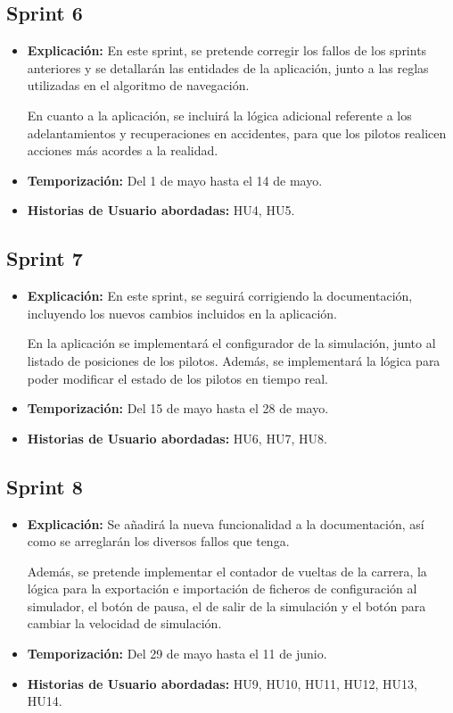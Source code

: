 \subsection{Sprint 6}

\begin{itemize}
    \item \textbf{Explicación:} En este sprint, se pretende corregir los fallos de los sprints anteriores y se detallarán las entidades de la aplicación, junto a las reglas utilizadas en el algoritmo de navegación.
    
    En cuanto a la aplicación, se incluirá la lógica adicional referente a los adelantamientos y recuperaciones en accidentes, para que los pilotos realicen acciones más acordes a la realidad.
    

    \item \textbf{Temporización:} Del 1 de mayo hasta el 14 de mayo.
    \item \textbf{Historias de Usuario abordadas:} HU4, HU5.
\end{itemize}

\subsection{Sprint 7}

\begin{itemize}
    \item \textbf{Explicación:} En este sprint, se seguirá corrigiendo la documentación, incluyendo los nuevos cambios incluidos en la aplicación.
    
    En la aplicación se implementará el configurador de la simulación, junto al listado de posiciones de los pilotos. Además, se implementará la lógica para poder modificar el estado de los pilotos en tiempo real.
    
    \item \textbf{Temporización:} Del 15 de mayo hasta el 28 de mayo.
    \item \textbf{Historias de Usuario abordadas:} HU6, HU7, HU8.
\end{itemize}

\subsection{Sprint 8}

\begin{itemize}
    \item \textbf{Explicación:} Se añadirá la nueva funcionalidad a la documentación, así como se arreglarán los diversos fallos que tenga.
    
    Además, se pretende implementar el contador de vueltas de la carrera, la lógica para la exportación e importación de ficheros de configuración al simulador, el botón de pausa, el de salir de la simulación y el botón para cambiar la velocidad de simulación.

    \item \textbf{Temporización:} Del 29 de mayo hasta el 11 de junio.
    \item \textbf{Historias de Usuario abordadas:} HU9, HU10, HU11, HU12, HU13, HU14.
\end{itemize}

